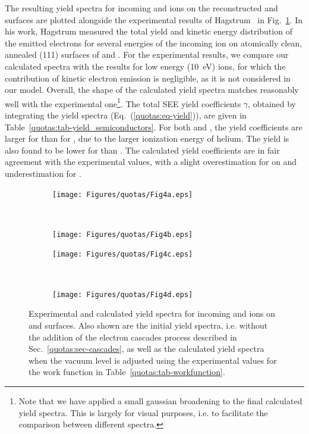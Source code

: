 \begin{refsection}
The resulting yield spectra for incoming  and  ions on the 
reconstructed  and  surfaces are plotted alongside the 
experimental results of Hagstrum~\cite{Hagstrum1960} in 
Fig.~\ref{quotas:fig-results_semiconductors}. In his work, Hagstrum measured 
the total yield and kinetic energy distribution of the emitted electrons for 
several energies of the incoming ion on atomically clean, annealed (111) 
surfaces of  and . For the experimental results, we 
compare our calculated spectra with the results for low energy 
(10~\si{\electronvolt}) ions, for which the contribution of kinetic electron 
emission is negligible, as it is not considered in our model. 
Overall, the shape of the calculated yield spectra matches reasonably well 
with the experimental one\footnote{Note that we have applied a small gaussian 
broadening to the final calculated yield spectra. This is largely for visual purposes, i.e. to facilitate 
the comparison between different spectra.}. 
The total SEE yield coefficients $\gamma$, obtained 
by integrating the yield spectra (Eq.~(\ref{quotas:eq-yield})), are given in 
Table~\ref{quotas:tab-yield_semiconductors}. For both  and , the 
yield coefficients are larger for  than for , due to the 
larger ionization energy of helium. The yield is also found to 
be lower for  than . The calculated yield coefficients 
are in fair agreement with the experimental values, with a slight 
overestimation for  on  and underestimation for 
. 

\begin{figure}[ht] 
    \centering 
    \captionsetup{width=0.9\textwidth}
    \begin{subfigure}[t]{0.49\textwidth} 
        \centering 
        \texttt{[image: Figures/quotas/Fig4a.eps]} 
    \end{subfigure}%
    ~  
    \begin{subfigure}[t]{0.49\textwidth} 
        \centering 
        \texttt{[image: Figures/quotas/Fig4b.eps]} 
    \end{subfigure} 
    \begin{subfigure}[t]{0.49\textwidth} 
        \centering 
        \texttt{[image: Figures/quotas/Fig4c.eps]} 
    \end{subfigure}%
    ~  
    \begin{subfigure}[t]{0.49\textwidth} 
        \centering 
        \texttt{[image: Figures/quotas/Fig4d.eps]} 
    \end{subfigure} 
    \caption{\label{quotas:fig-results_semiconductors} Experimental and 
calculated yield spectra for incoming  and  ions on 
 and  surfaces. Also shown are the initial yield 
spectra, i.e. without the addition of the electron cascades process described 
in Sec.~\ref{quotas:sec-cascades}, as well as the calculated yield spectra 
when the vacuum level is adjusted using the experimental values for the work 
function in Table~\ref{quotas:tab-workfunction}.} 
\end{figure} 


\end{refsection}
